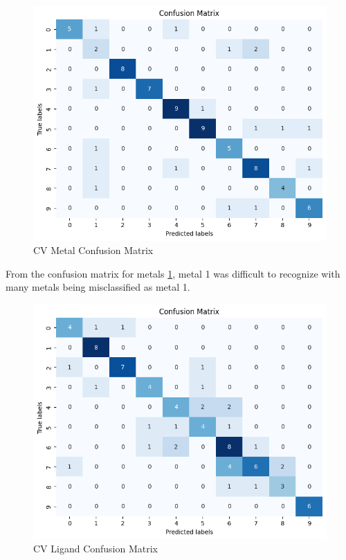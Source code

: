 \begin{figure}[h!]
  \centering
    \includegraphics[width=1.0\textwidth]{figures/cv_metal_matrix.png}
    \caption{CV Metal Confusion Matrix}
    \label{cv_metal_matrix}
\end{figure}
From the confusion matrix for metals \ref{cv_metal_matrix}, metal 1 was difficult to recognize with many metals being misclassified as metal 1. 
\begin{figure}[h!]
  \centering
    \includegraphics[width=1.0\textwidth]{figures/cv_ligand_matrix.png}
    \caption{CV Ligand Confusion Matrix}
    \label{cv_ligand_matrix}
\end{figure}
